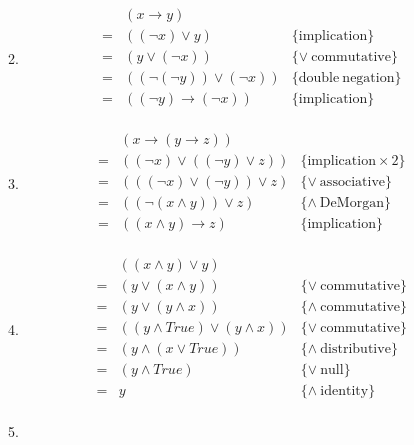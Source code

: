\documentclass{article}
\begin{document}
\begin{enumerate}
\begin{enumerate}
\[\begin{array}{lll}
          \end{array} \]
        \item
          \[ \begin{array}{lll}
              & (x \to y) & \\
            = & ((\neg x) \vee y) & \{\mathrm{implication}\} \\
            = & (y \vee (\neg x)) & \{\vee \mathrm{\ commutative}\} \\
            = & ((\neg (\neg y)) \vee (\neg x)) & \{\mathrm{double\ negation}\} \\
            = & ((\neg y) \to (\neg x)) & \{\mathrm{implication}\} \\
          \end{array} \]
        \item
          \[ \begin{array}{lll}
              & (x \to (y \to z)) & \\
            = & ((\neg x) \vee ((\neg y) \vee z)) & \{\mathrm{implication}\times 2\} \\
            = & (((\neg x) \vee (\neg y)) \vee z) & \{\vee \mathrm{\ associative}\} \\
            = & ((\neg (x \wedge y)) \vee z) & \{\wedge \mathrm{\ DeMorgan}\} \\
            = & ((x \wedge y) \to z) & \{\mathrm{implication}\} \\
          \end{array} \]
        \item
          \[ \begin{array}{lll}
              & ((x \wedge y) \vee y) & \\
            = & (y \vee (x \wedge y)) & \{\vee \mathrm{\ commutative}\} \\
            = & (y \vee (y \wedge x)) & \{\wedge \mathrm{\ commutative}\} \\
            = & ((y \wedge True) \vee (y \wedge x)) & \{\vee \mathrm{\ commutative}\} \\
            = & (y \wedge (x \vee True)) & \{\wedge \mathrm{\ distributive}\} \\
            = & (y \wedge True) & \{\vee \mathrm{\ null}\} \\
            = & y & \{\wedge \mathrm{\ identity}\} \\
          \end{array} \]
        \item
          \[ \begin{array}{lll}

\end{array}\]
\end{enumerate}
\end{enumerate}
\end{document}
